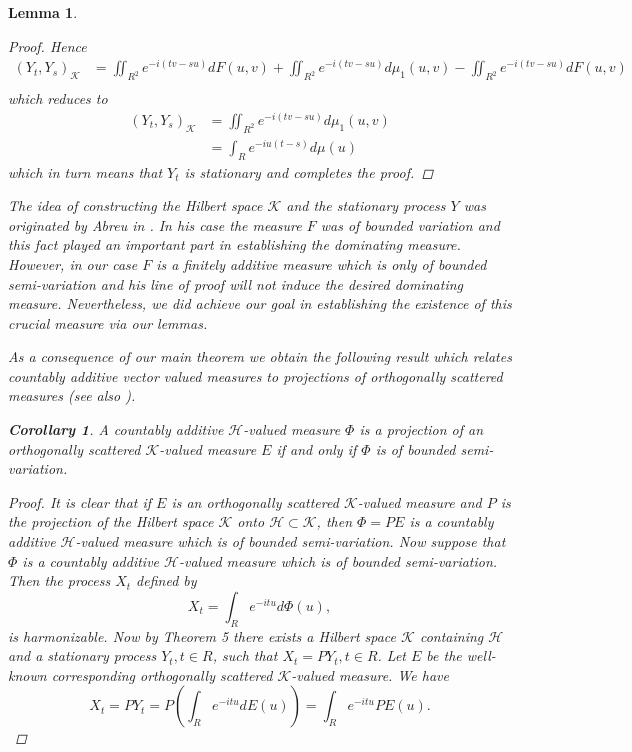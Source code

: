 \documentclass{article}
\newtheorem{lemma}[theorem]{Lemma}
\newtheorem{corollary}[theorem]{Corollary}
\begin{document}
\begin{lemma}
\begin{enumerate}
\begin{proof}
Hence
\begin{align}
(Y_t, Y_s)_{\mathscr{K}} &= \iint_{R^2} e^{-i(tv-su)} dF(u, v) + \iint_{R^2} e^{-i(tv-su)} d\mu_1(u, v) - \iint_{R^2} e^{-i(tv-su)} dF(u, v)\\
\end{align}
which reduces to
\begin{align}
(Y_t, Y_s)_{\mathscr{K}} &= \iint_{R^2} e^{-i(tv-su)} d\mu_1(u, v)\\
&= \int_R e^{-iu(t-s)} d\mu(u)
\end{align}
which in turn means that $Y_t$ is stationary and completes the proof.
\end{proof}

The idea of constructing the Hilbert space $\mathscr{K}$ and the stationary process $Y$ was originated by Abreu in \cite{abreu}. In his case the measure $F$ was of bounded variation and this fact played an important part in establishing the dominating measure. However, in our case $F$ is a finitely additive measure which is only of bounded semi-variation and his line of proof will not induce the desired dominating measure. Nevertheless, we did achieve our goal in establishing the existence of this crucial measure via our lemmas.

As a consequence of our main theorem we obtain the following result which relates countably additive vector valued measures to projections of orthogonally scattered measures (see also \cite{niemi2}).

\begin{corollary}
A countably additive $\mathscr{H}$-valued measure $\Phi$ is a projection of an orthogonally scattered $\mathscr{K}$-valued measure $E$ if and only if $\Phi$ is of bounded semi-variation.
\end{corollary}

\begin{proof}
It is clear that if $E$ is an orthogonally scattered $\mathscr{K}$-valued measure and $P$ is the projection of the Hilbert space $\mathscr{K}$ onto $\mathscr{H} \subset \mathscr{K}$, then $\Phi = PE$ is a countably additive $\mathscr{H}$-valued measure which is of bounded semi-variation. Now suppose that $\Phi$ is a countably additive $\mathscr{H}$-valued measure which is of bounded semi-variation. Then the process $X_t$ defined by
\begin{equation}
X_t = \int_R e^{-itu} d\Phi(u),
\end{equation}
is harmonizable. Now by Theorem 5 there exists a Hilbert space $\mathscr{K}$ containing $\mathscr{H}$ and a stationary process $Y_t, t \in R$, such that $X_t = PY_t, t \in R$. Let $E$ be the well-known corresponding orthogonally scattered $\mathscr{K}$-valued measure. We have
\begin{equation}
X_t = PY_t = P\left(\int_R e^{-itu} dE(u)\right) = \int_R e^{-itu} PE(u).
\end{equation}


\end{proof}
\end{enumerate}
\end{lemma}
\end{document}
